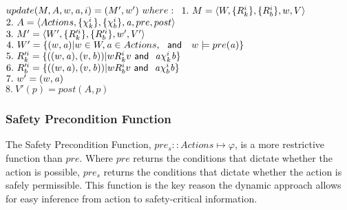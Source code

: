 $update(M,A,w,\laa,i) = (M',w')\ where:\\$
$1.\  M = \langle W, \{R_{k}^{i}\}, \{R_{b}^{i}\}, w, V \rangle$\\
$2.\  A = \langle Actions, \{\chi_{k}^i\}, \{\chi_{b}^i\}, \mathit{a}, pre, post \rangle$\\
$3.\  M' = \langle W', \{R_{k}'^{i}\}, \{R_{b}'^{i}\}, w', V' \rangle$\\
$4.\  W' = \{(w,\mathit{a}) | w\in W,\mathit{a} \in Actions,\ \textsf{\ and \ }\ w\models pre(\mathit{a})\}$\\
$5.\  R_{k}'^{i} = \{((w,\mathit{a}),(v,\mathit{b}))|wR_{k}^i v \textsf{\ and \ } \mathit{a} \chi_{k}^i \mathit{b} \}$\\
$6.\  R_{b}'^{i} = \{((w,\mathit{a}),(v,\mathit{b}))|wR_{b}^i v \textsf{\ and \ } \mathit{a} \chi_{b}^i \mathit{b} \}$\\
$7.\  w' = (w,\mathit{a})$\\ 
$8.\  V'(p) = post(A,p)$

\subsubsection{Safety Precondition Function}
The Safety Precondition Function, $pre_s :: Actions \mapsto \varphi$, is a more restrictive function than $pre$. Where $pre$ returns the conditions that dictate whether the action is possible, $pre_s$ returns the conditions that dictate whether the action is safely permissible. This function is the key reason the dynamic approach allows for easy inference from action to safety-critical information.

